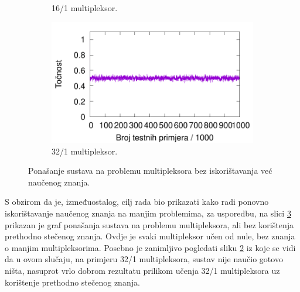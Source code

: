 \documentclass[times, utf8, zavrsni]{fer}
\begin{document}
\begin{figure}[!h]
\begin{subfigure}{0.496\textwidth}
        \caption{16/1 multipleksor.}
        \label{fig:20muxnre}
    \end{subfigure}
    \begin{subfigure}{0.496\textwidth}
        \centering
        \includegraphics[width=\textwidth]{img/multiplexer/37muxnre.pdf}
        \caption{32/1 multipleksor.}
        \label{fig:37muxnre}
    \end{subfigure}
    \caption{Ponašanje sustava na problemu multipleksora bez iskorištavanja već naučenog znanja.}
    \label{fig:muxnre}
\end{figure}
S obzirom da je, izmeđuostalog, cilj rada bio prikazati kako radi ponovno iskorištavanje naučenog znanja na manjim problemima, za usporedbu, na slici \ref{fig:muxnre} prikazan je graf ponašanja sustava na problemu multipleksora, ali bez korištenja prethodno stečenog znanja.
Ovdje je svaki multipleksor učen od nule, bez znanja o manjim multipleksorima.
Posebno je zanimljivo pogledati sliku \ref{fig:37muxnre} iz koje se vidi da u ovom slučaju, na primjeru 32/1 multipleksora, sustav nije naučio gotovo ništa, nasuprot vrlo dobrom rezultatu prilikom učenja 32/1 multipleksora uz korištenje prethodno stečenog znanja.
\end{document}
